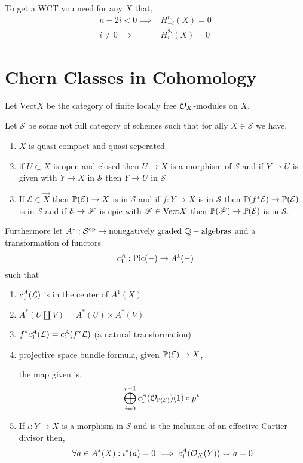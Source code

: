 \documentclass[12pt]{article}
\begin{document}
\begin{remark}
To get a WCT you need for any $X$ that,
\begin{align*}
n - 2 i < 0 \implies & H^n_{-i}(X) = 0 
\\
i \neq 0 \implies & H^{2 i}_i(X) = 0 
\end{align*}
\end{remark}

\section{Chern Classes in Cohomology}

\newcommand{\E}{\mathcal{E}}
\newcommand{\Vect}{\mathrm{Vect}}
\renewcommand{\S}{\mathcal{S}}

\begin{definition}
Let $\Vect{X}$ be the category of finite locally free $\mathcal{O}_{X}$-modules on $X$.
\end{definition}

\begin{remark}
Let $\S$ be some not full category of schemes such that for ally $X \in \S$ we have,
\begin{enumerate}
\item $X$ is quasi-compact and quasi-seperated
\item if $U \subset X$ is open and closed then $U \to X$ is a morphism of $\S$ and if $Y \to U$ is given with $Y \to X$ in $\S$ then $Y \to U$ in $\S$
\item If $\E \in \Vec{X}$ then $\P(\E) \to X$ is in $\S$ and if $f : Y \to X$ is in $\S$ then $\P(f^* \E) \to \P(\E)$ is in $\S$ and if $\E \to \F$ is epic with $\F \in \Vect{X}$ then $\P(\F) \to \P(\E)$ is in $\S$. 
\end{enumerate}
Furthermore let $A^* : \S^{\op} \to \text{nonegatively graded } \Q-\text{algebras}$ and a transformation of functors
\[ c_1^A : \mathrm{Pic}(-) \to A^1(-) \] 
such that
\begin{enumerate}
\item $c_1^A(\mathcal{L})$ is in the center of $A^1(X)$
\item $A^*(U \coprod V) = A^*(U) \times A^*(V)$
\item $f^* c_1^A(\mathcal{L}) = c_1^A(f^* \mathcal{L})$ (a natural transformation)
\item projective space bundle formula, given $\P(\E) \to X$,
\begin{center}
\end{center}
the map given is,
\[ \bigoplus_{i = 0}^{r - 1} c_1^A(\struct{\P(\E)}) (1) \circ p^* \]
\item If $\iota : Y \to X$ is a morphism in $\S$ and is the inclusion of an effective Cartier divisor then,
\[ \forall a \in A^*(X) : \iota^*(a) = 0 \implies c^A_1(\mathcal{O}_{X}(Y)) \smile a = 0 \]
\end{enumerate}
\end{remark}
\end{document}
